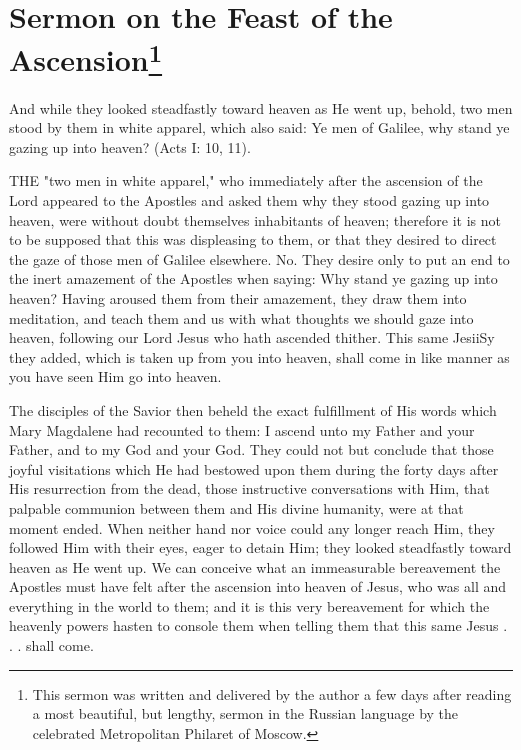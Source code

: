\chapter{Sermon on the Feast of the Ascension\footnote{This sermon was written and delivered by the author a few days after reading a most beautiful, but lengthy, sermon in the Russian language by the celebrated Metropolitan Philaret of Moscow.}}

And while they looked steadfastly toward heaven as He 
went up, behold, two men stood by them in white apparel, 
which also said: Ye men of Galilee, why stand ye gazing 
up into heaven? (Acts I: 10, 11). 

THE "two men in white apparel," who immediately
after the ascension of the Lord appeared
to the Apostles and asked them why they 
stood gazing up into heaven, were without doubt 
themselves inhabitants of heaven; therefore it 
is not to be supposed that this was displeasing 
to them, or that they desired to direct the gaze of 
those men of Galilee elsewhere. No. They desire
only to put an end to the inert amazement 
of the Apostles when saying: Why stand ye 
gazing up into heaven? Having aroused them 
from their amazement, they draw them into meditation,
and teach them and us with what thoughts 
we should gaze into heaven, following our Lord 
Jesus who hath ascended thither. This same
JesiiSy they added, which is taken up from you 
into heaven, shall come in like manner as you 
have seen Him go into heaven. 

The disciples of the Savior then beheld the 
exact fulfillment of His words which Mary 
Magdalene had recounted to them: I ascend 
unto my Father and your Father, and to my 
God and your God. They could not but conclude
that those joyful visitations which He had 
bestowed upon them during the forty days after 
His resurrection from the dead, those instructive 
conversations with Him, that palpable communion
between them and His divine humanity, were 
at that moment ended. When neither hand nor 
voice could any longer reach Him, they followed 
Him with their eyes, eager to detain Him; they 
looked steadfastly toward heaven as He went 
up. We can conceive what an immeasurable 
bereavement the Apostles must have felt after 
the ascension into heaven of Jesus, who was all 
and everything in the world to them; and it is 
this very bereavement for which the heavenly 
powers hasten to console them when telling them 
that this same Jesus . . . shall come. 

